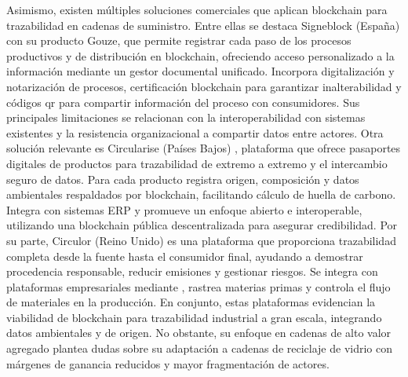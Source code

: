 Asimismo, existen múltiples soluciones comerciales que aplican blockchain para trazabilidad en cadenas de suministro. Entre ellas se destaca Signeblock (España) \cite{signeblock2024} con su producto Gouze, que permite registrar cada paso de los procesos productivos y de distribución en blockchain, ofreciendo acceso personalizado a la información mediante un gestor documental unificado. Incorpora digitalización y notarización de procesos, certificación blockchain para garantizar inalterabilidad y códigos \acrshort{qr} para compartir información del proceso con consumidores. Sus principales limitaciones se relacionan con la interoperabilidad con sistemas existentes y la resistencia organizacional a compartir datos entre actores. Otra solución relevante es Circularise (Países Bajos) \cite{circularise2024}, plataforma que ofrece pasaportes digitales de productos para trazabilidad de extremo a extremo y el intercambio seguro de datos. Para cada producto registra origen, composición y datos ambientales respaldados por blockchain, facilitando cálculo de huella de carbono. Integra con sistemas ERP y promueve un enfoque abierto e interoperable, utilizando una blockchain pública descentralizada para asegurar credibilidad. Por su parte, Circulor (Reino Unido) \cite{circulor2024} es una plataforma que proporciona trazabilidad completa desde la fuente hasta el consumidor final, ayudando a demostrar procedencia responsable, reducir emisiones y gestionar riesgos. Se integra con plataformas empresariales mediante , rastrea materias primas y controla el flujo de materiales en la producción. En conjunto, estas plataformas evidencian la viabilidad de blockchain para trazabilidad industrial a gran escala, integrando datos ambientales y de origen. No obstante, su enfoque en cadenas de alto valor agregado plantea dudas sobre su adaptación a cadenas de reciclaje de vidrio con márgenes de ganancia reducidos y mayor fragmentación de actores.

